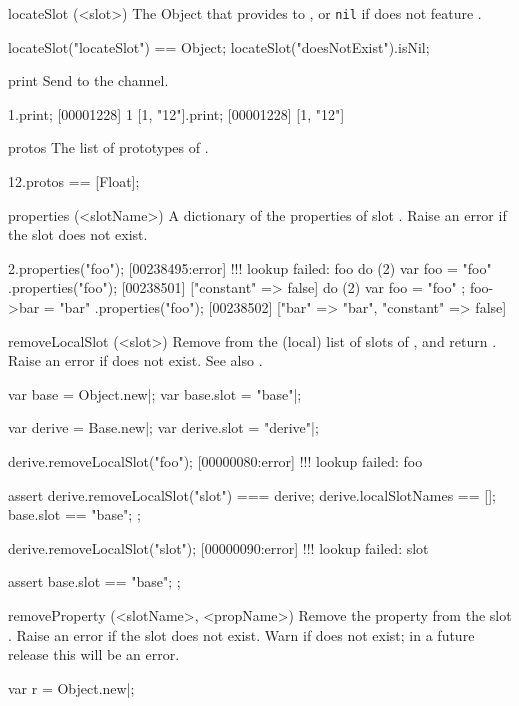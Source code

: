 \begin{urbiscriptapi}
\item[locateSlot](<slot>)%
  The Object that provides  to \this, or \lstinline|nil| if \this
  does not feature .
\begin{urbiassert}
locateSlot("locateSlot") == Object;
locateSlot("doesNotExist").isNil;
\end{urbiassert}

\item[print] Send \this to the  channel.
\begin{urbiscript}
1.print;
[00001228] 1
[1, "12"].print;
[00001228] [1, "12"]
\end{urbiscript}

\item[protos]
  The list of prototypes of \this.
\begin{urbiassert}
12.protos == [Float];
\end{urbiassert}

\item[properties](<slotName>)%
  A dictionary of the properties of slot .  Raise an error if
  the slot does not exist.
\begin{urbiscript}
2.properties("foo");
[00238495:error] !!! lookup failed: foo
do (2) { var foo = "foo" }.properties("foo");
[00238501] ["constant" => false]
do (2) { var foo = "foo" ; foo->bar = "bar" }.properties("foo");
[00238502] ["bar" => "bar", "constant" => false]
\end{urbiscript}

\item[removeLocalSlot](<slot>)%
  Remove  from the (local) list of slots of \this, and return
  \this.  Raise an error if  does not exist.  See also
  .
\begin{urbiscript}
var base = Object.new|;
var base.slot = "base"|;

var derive = Base.new|;
var derive.slot = "derive"|;

derive.removeLocalSlot("foo");
[00000080:error] !!! lookup failed: foo

assert
{
  derive.removeLocalSlot("slot") === derive;
  derive.localSlotNames == [];
  base.slot == "base";
};

derive.removeLocalSlot("slot");
[00000090:error] !!! lookup failed: slot

assert
{
  base.slot == "base";
};
\end{urbiscript}


\item[removeProperty](<slotName>, <propName>)%
  Remove the property  from the slot .  Raise an
  error if the slot does not exist.  Warn if  does not exist;
  in a future release this will be an error.
\begin{urbiscript}
var r = Object.new|;


\end{urbiscript}
\end{urbiscriptapi}
